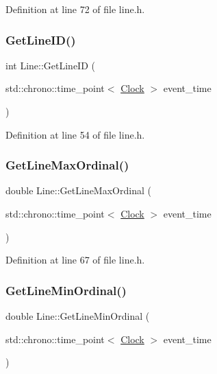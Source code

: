 Definition at line 72 of file line.\+h.

\mbox{\label{class_line_a20756feda4d42032955ec6cf12d89941}} 
\subsubsection{\texorpdfstring{Get\+Line\+I\+D()}{GetLineID()}}
{\footnotesize\ttfamily int Line\+::\+Get\+Line\+ID (\begin{DoxyParamCaption}\item[{std\+::chrono\+::time\+\_\+point$<$ \mbox{\hyperlink{universe_8h_a0ef8d951d1ca5ab3cfaf7ab4c7a6fd80}{Clock}} $>$}]{event\+\_\+time }\end{DoxyParamCaption})\hspace{0.3cm}{\ttfamily [inline]}}



Definition at line 54 of file line.\+h.

\mbox{\label{class_line_a3fc7779998759b641ec2b7bc8515563a}} 
\subsubsection{\texorpdfstring{Get\+Line\+Max\+Ordinal()}{GetLineMaxOrdinal()}}
{\footnotesize\ttfamily double Line\+::\+Get\+Line\+Max\+Ordinal (\begin{DoxyParamCaption}\item[{std\+::chrono\+::time\+\_\+point$<$ \mbox{\hyperlink{universe_8h_a0ef8d951d1ca5ab3cfaf7ab4c7a6fd80}{Clock}} $>$}]{event\+\_\+time }\end{DoxyParamCaption})\hspace{0.3cm}{\ttfamily [inline]}}



Definition at line 67 of file line.\+h.

\mbox{\label{class_line_a7b105f0af704489446cc93302c30813d}} 
\subsubsection{\texorpdfstring{Get\+Line\+Min\+Ordinal()}{GetLineMinOrdinal()}}
{\footnotesize\ttfamily double Line\+::\+Get\+Line\+Min\+Ordinal (\begin{DoxyParamCaption}\item[{std\+::chrono\+::time\+\_\+point$<$ \mbox{\hyperlink{universe_8h_a0ef8d951d1ca5ab3cfaf7ab4c7a6fd80}{Clock}} $>$}]{event\+\_\+time }\end{DoxyParamCaption})\hspace{0.3cm}{\ttfamily [inline]}}




